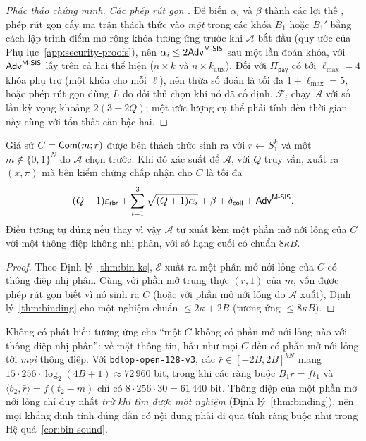 \begin{proof}[Phác thảo chứng minh]
\emph{Các phép rút gọn \MSIS{}.} Để biến $\alpha_i$ và $\beta$ thành các lợi thế
\MSIS{}, phép rút gọn cấy ma trận thách thức vào \emph{một} trong các khóa
$B_1$ hoặc $B_1'$ bằng cách lập trình điểm mở rộng khóa tương ứng trước khi
$\mathcal A$ bắt đầu (quy ước của Phụ lục~\ref{app:security-proofs}), nên
$\alpha_i\le2\mathsf{Adv}^{\textsf{M-SIS}}$ sau một lần đoán khóa, với $\mathsf{Adv}^{\textsf{M-SIS}}$ lấy trên
cả hai thể hiện ($n\times k$ và $n\times k_{\mathrm{aux}}$). Đối với
$\Pi_{\mathsf{pay}}$ có tới $\ell_{\max}=4$ khóa phụ trợ (một khóa cho mỗi
$\ell$), nên thừa số đoán là tối đa $1+\ell_{\max}=5$, hoặc phép rút gọn dùng
$L$ do đối thủ chọn khi nó đã cố định. $\mathcal F_i$ chạy $\mathcal A$ với số
lần kỳ vọng khoảng $2(3+2Q)$; một ước lượng cụ thể phải tính đến thời gian này
cùng với tổn thất căn bậc hai.
\end{proof}

\begin{corollary}
\label{cor:bin-sound}
Giả sử $C=\mathsf{Com}(m;r)$ được bên thách thức sinh ra với $r\leftarrow S_1^k$ và một
$m\notin\{0,1\}^N$ do $\mathcal A$ chọn trước. Khi đó xác suất để $\mathcal A$,
với $Q$ truy vấn, xuất ra $(x,\pi)$ mà bên kiểm chứng chấp nhận cho $C$ là tối đa
\[
(Q+1)\varepsilon_{\mathsf{rbr}}+\sum_{i=1}^3\sqrt{(Q+1)\alpha_i}+\beta+\delta_{\mathsf{coll}}
+\mathsf{Adv}^{\textsf{M-SIS}}.
\]
Điều tương tự đúng nếu thay vì vậy $\mathcal A$ tự xuất kèm một phần mở nới lỏng
của $C$ với một thông điệp không nhị phân, với số hạng \MSIS{} cuối có chuẩn
$8\kappa B$.
\end{corollary}
\begin{proof}
Theo Định lý~\ref{thm:bin-ks}, $\mathcal E$ xuất ra một phần mở nới lỏng của $C$
có thông điệp nhị phân. Cùng với phần mở trung thực $(r,1)$ của $m$, vốn được
phép rút gọn biết vì nó sinh ra $C$ (hoặc với phần mở nới lỏng do $\mathcal A$
xuất), Định lý~\ref{thm:binding} cho một nghiệm \MSIS{} chuẩn
$\le2\kappa+2B$ (tương ứng $\le8\kappa B$).
\end{proof}
\noindent
Không có phát biểu tương ứng cho ``một $C$ không có phần mở nới lỏng nào với
thông điệp nhị phân'': về mặt thông tin, hầu như mọi $C$ đều có phần mở nới lỏng
tới \emph{mọi} thông điệp. Với \texttt{bdlop-open-128-v3}, các
$\bar r\in[-2B,2B]^{kN}$ mang $15\cdot256\cdot\log_2(4B+1)\approx72\,960$ bit,
trong khi các ràng buộc $B_1\bar r=ft_1$ và $\langle b_2,\bar r\rangle=f(t_2-m)$
chỉ có $8\cdot256\cdot30=61\,440$ bit. Thông điệp của một phần mở nới lỏng chỉ
duy nhất \emph{trừ khi tìm được một nghiệm \MSIS{}} (Định lý~\ref{thm:binding}),
nên mọi khẳng định tính đúng đắn có nội dung phải đi qua tính ràng buộc như
trong Hệ quả~\ref{cor:bin-sound}.

